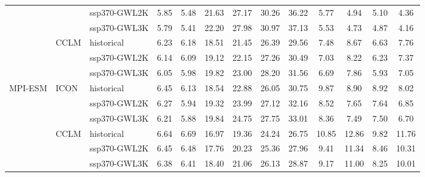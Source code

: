 \begin{table}[!htbp]
{\begin{tabular}{lll|cc|cc|cc|cc|cc}
 &  & ssp370-GWL2K & 5.85 & 5.48 & 21.63 & 27.17 & 30.26 & 36.22 & 5.77 & 4.94 & 5.10 & 4.36 \\
 &  & ssp370-GWL3K & 5.79 & 5.41 & 22.20 & 27.98 & 30.97 & 37.13 & 5.53 & 4.73 & 4.87 & 4.16 \\
\cmidrule{2-13}
 & \multirow{3}{*}{CCLM} & historical & 6.23 & 6.18 & 18.51 & 21.45 & 26.39 & 29.56 & 7.48 & 8.67 & 6.63 & 7.76 \\
 &  & ssp370-GWL2K & 6.14 & 6.09 & 19.12 & 22.15 & 27.26 & 30.49 & 7.03 & 8.22 & 6.23 & 7.37 \\
 &  & ssp370-GWL3K & 6.05 & 5.98 & 19.82 & 23.00 & 28.20 & 31.56 & 6.69 & 7.86 & 5.93 & 7.05 \\
\midrule
\multirow{6}{*}{MPI-ESM} & \multirow{3}{*}{ICON} & historical & 6.45 & 6.13 & 18.54 & 22.88 & 26.05 & 30.75 & 9.87 & 8.90 & 8.92 & 8.02 \\
 &  & ssp370-GWL2K & 6.27 & 5.94 & 19.32 & 23.99 & 27.12 & 32.16 & 8.52 & 7.65 & 7.64 & 6.85 \\
 &  & ssp370-GWL3K & 6.21 & 5.88 & 19.84 & 24.75 & 27.75 & 33.01 & 8.36 & 7.49 & 7.50 & 6.70 \\
\cmidrule{2-13}
 & \multirow{3}{*}{CCLM} & historical & 6.64 & 6.69 & 16.97 & 19.36 & 24.24 & 26.75 & 10.85 & 12.86 & 9.82 & 11.76 \\
 &  & ssp370-GWL2K & 6.45 & 6.48 & 17.76 & 20.23 & 25.36 & 27.96 & 9.41 & 11.34 & 8.46 & 10.31 \\
 &  & ssp370-GWL3K & 6.38 & 6.41 & 18.40 & 21.06 & 26.13 & 28.87 & 9.17 & 11.00 & 8.25 & 10.01 \\
\bottomrule
\end{tabular}
}
\end{table}
